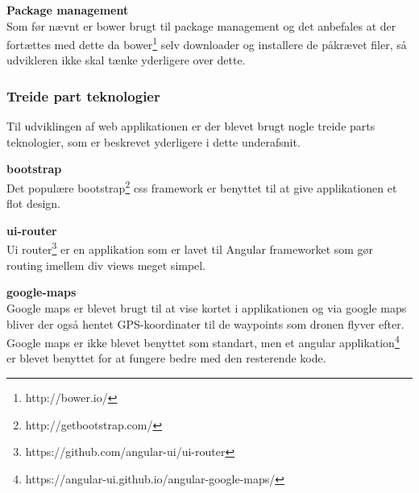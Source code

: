 \textbf{Package management}\\
Som før nævnt er bower brugt til package management og det anbefales at der fortættes med dette da bower\footnote{http://bower.io/} selv downloader og installere de påkrævet filer, så udvikleren ikke skal tænke yderligere over dette.  

\newpage

\subsubsection*{Treide part teknologier}
Til udviklingen af web applikationen er der blevet brugt nogle treide parts teknologier, som er beskrevet yderligere i dette underafsnit.

\textbf{bootstrap}\\
Det populære bootstrap\footnote{http://getbootstrap.com/} css framework er benyttet til at give applikationen et flot design.

\textbf{ui-router}\\
Ui router\footnote{https://github.com/angular-ui/ui-router} er en applikation som er lavet til Angular frameworket som gør routing imellem div views meget simpel. 

\textbf{google-maps}\\
Google maps er blevet brugt til at vise kortet i applikationen og via google maps bliver der også hentet GPS-koordinater til de waypoints som dronen flyver efter. Google maps er ikke blevet benyttet som standart, men et angular applikation\footnote{https://angular-ui.github.io/angular-google-maps/} er blevet benyttet for at fungere bedre med den resterende kode.